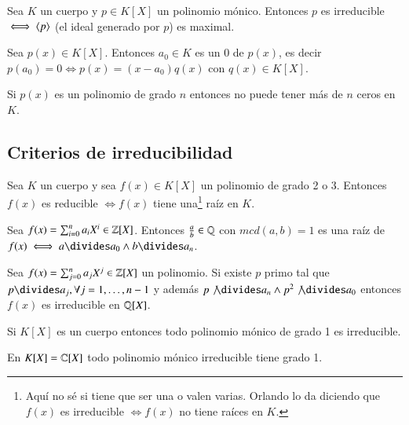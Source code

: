 \begin{pro}
	\label{pro:irreducibleiffmaximal}
	Sea $K$ un cuerpo y $p \in K[X]$ un polinomio mónico. Entonces $p$ es irreducible $\iff \langle p\rangle$ (el ideal generado por $p$) es maximal.
\end{pro}


\begin{pro}
	Sea $p(x) \in K[X]$. Entonces $a_0 \in K$ es un $0$ de $p(x)$, es decir $p(a_0) = 0 \iff p(x) = (x-a_0)q(x)$ con $q(x) \in K[X]$.
\end{pro}

\begin{obs}
	Si $p(x)$ es un polinomio de grado $n$ entonces no puede tener más de $n$ ceros en $K$.
\end{obs}

\subsection{Criterios de irreducibilidad}

\begin{thm}\cite[p.222]{dor96}
	Sea $K$ un cuerpo y sea $f(x) \in K[X]$ un polinomio de grado 2 o 3. Entonces $f(x)$ es reducible $\iff f(x)$ tiene una\footnote{Aquí no sé si tiene que ser una o valen varias. Orlando lo da diciendo que $f(x)$ es irreducible $\iff f(x)$ no tiene raíces en $K$.} raíz en $K$.
\end{thm}

\begin{pro}
	
		Sea $f(x) = \sum_{i=0}^{n}a_iX^i \in \mathbb{Z}[X]$. Entonces $\frac{a}{b} \in \mathbb{Q}$ con $mcd(a,b) = 1$ es una raíz de $f(x) \iff a \divides a_0 \land b \divides a_n$.
\end{pro}

\begin{thm}
	Sea $f(x) = \sum_{j=0}^{n}a_jX^j \in \mathbb{Z}[X]$ un polinomio. Si existe $p$ primo tal que $p \divides a_j, \forall j = 1, \dots, n-1$ y además $p \not\divides a_n \land p^2 \not\divides a_0$ entonces $f(x)$ es irreducible en $\mathbb{Q}[X]$.
\end{thm}

\begin{pro}
	Si $K[X]$ es un cuerpo entonces todo polinomio mónico de grado 1 es irreducible.
\end{pro}

\begin{obs}
	En $K[X] = \mathbb{C}[X]$ todo polinomio mónico irreducible tiene grado 1.
\end{obs}


